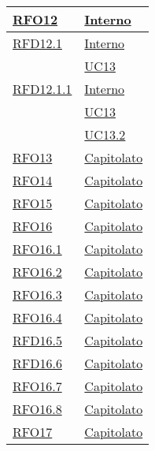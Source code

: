 \begin{longtable}{|>{\centering}m{5cm}|m{5cm}<{\centering}|}
\hyperlink{RFO12}{RFO12} & \hyperlink{Interno}{Interno}\\ \hline

\hyperlink{RFD12.1}{RFD12.1} & \hyperlink{Interno}{Interno}\\
& \hyperref[UC13]{UC13}\\ \hline

\hyperlink{RFD12.1.1}{RFD12.1.1} & \hyperlink{Interno}{Interno}\\
& \hyperref[UC13]{UC13}\\
& \hyperref[UC13.2]{UC13.2}\\ \hline

\hyperlink{RFO13}{RFO13} & \hyperlink{Capitolato}{Capitolato}\\ \hline

\hyperlink{RFO14}{RFO14} & \hyperlink{Capitolato}{Capitolato}\\ \hline

\hyperlink{RFO15}{RFO15} & \hyperlink{Capitolato}{Capitolato}\\ \hline

\hyperlink{RFO16}{RFO16} & \hyperlink{Capitolato}{Capitolato}\\ \hline

\hyperlink{RFO16.1}{RFO16.1} & \hyperlink{Capitolato}{Capitolato}\\ \hline

\hyperlink{RFO16.2}{RFO16.2} & \hyperlink{Capitolato}{Capitolato}\\ \hline

\hyperlink{RFO16.3}{RFO16.3} & \hyperlink{Capitolato}{Capitolato}\\ \hline

\hyperlink{RFO16.4}{RFO16.4} & \hyperlink{Capitolato}{Capitolato}\\ \hline

\hyperlink{RFD16.5}{RFD16.5} & \hyperlink{Capitolato}{Capitolato}\\ \hline

\hyperlink{RFD16.6}{RFD16.6} & \hyperlink{Capitolato}{Capitolato}\\ \hline

\hyperlink{RFO16.7}{RFO16.7} & \hyperlink{Capitolato}{Capitolato}\\ \hline

\hyperlink{RFO16.8}{RFO16.8} & \hyperlink{Capitolato}{Capitolato}\\ \hline

\hyperlink{RFO17}{RFO17} & \hyperlink{Capitolato}{Capitolato}\\ \hline


\end{longtable}
